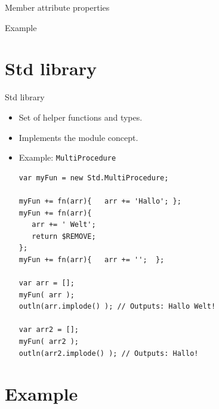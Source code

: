 \documentclass[ucs,9pt]{beamer}
\begin{document}
\begin{frame}{Member attribute properties}
	\begin{block}{Example}
		
	\end{block}
\end{frame}

\section{Std library}
\begin{frame}[fragile]{Std library}
	\begin{itemize}
		\item Set of helper functions and types.
		\item Implements the module concept.
		\item Example: \lstinline!MultiProcedure!
		\begin{lstlisting}
var myFun = new Std.MultiProcedure;

myFun += fn(arr){	arr += 'Hallo'; };
myFun += fn(arr){	
   arr += ' Welt'; 
   return $REMOVE;
};  
myFun += fn(arr){	arr += '';  };

var arr = [];
myFun( arr );
outln(arr.implode() ); // Outputs: Hallo Welt!

var arr2 = [];
myFun( arr2 );
outln(arr2.implode() ); // Outputs: Hallo!

		\end{lstlisting}
	\end{itemize}
	
\end{frame}


\section{Example}


\end{document}
